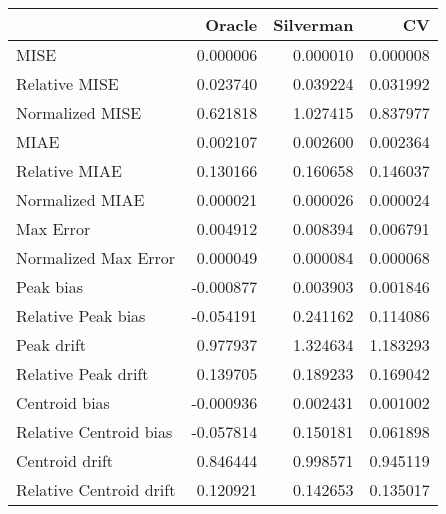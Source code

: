 \begin{tabular}{lrrr}
  \hline
 & Oracle & Silverman & CV \\ 
  \hline
MISE & 0.000006 & 0.000010 & 0.000008 \\ 
  Relative MISE & 0.023740 & 0.039224 & 0.031992 \\ 
  Normalized MISE & 0.621818 & 1.027415 & 0.837977 \\ 
  MIAE & 0.002107 & 0.002600 & 0.002364 \\ 
  Relative MIAE & 0.130166 & 0.160658 & 0.146037 \\ 
  Normalized MIAE & 0.000021 & 0.000026 & 0.000024 \\ 
  Max Error & 0.004912 & 0.008394 & 0.006791 \\ 
  Normalized Max Error & 0.000049 & 0.000084 & 0.000068 \\ 
  Peak bias & -0.000877 & 0.003903 & 0.001846 \\ 
  Relative Peak bias & -0.054191 & 0.241162 & 0.114086 \\ 
  Peak drift & 0.977937 & 1.324634 & 1.183293 \\ 
  Relative Peak drift & 0.139705 & 0.189233 & 0.169042 \\ 
  Centroid bias & -0.000936 & 0.002431 & 0.001002 \\ 
  Relative Centroid bias & -0.057814 & 0.150181 & 0.061898 \\ 
  Centroid drift & 0.846444 & 0.998571 & 0.945119 \\ 
  Relative Centroid drift & 0.120921 & 0.142653 & 0.135017 \\ 
   \hline
\end{tabular}
